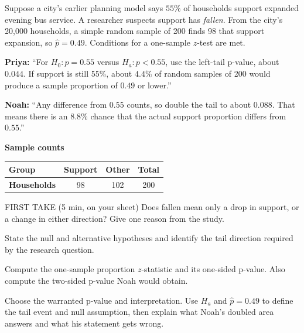 \documentclass[14pt]{extarticle}
\begin{document}
\pagestyle{empty}


\noindent\begin{minipage}[t]{0.57\linewidth}
\vspace{0pt}
Suppose a city's earlier planning model says $55\%$ of households support expanded evening bus service. A researcher suspects support has \emph{fallen}. From the city's 20{,}000 households, a simple random sample of 200 finds 98 that support expansion, so $\hat p=0.49$. Conditions for a one-sample $z$-test are met.\par\smallskip \textbf{Priya:} ``For $H_0:p=0.55$ versus $H_a:p<0.55$, use the left-tail p-value, about $0.044$. If support is still $55\%$, about $4.4\%$ of random samples of 200 would produce a sample proportion of $0.49$ or lower.''\par \textbf{Noah:} ``Any difference from $0.55$ counts, so double the tail to about $0.088$. That means there is an $8.8\%$ chance that the actual support proportion differs from $0.55$.''\par
\end{minipage}\hfill
\begin{minipage}[t]{0.40\linewidth}
\vspace{0pt}
\begin{center}
\textbf{Sample counts}\par\smallskip
\begin{tabular}{|l|c|c|c|}
\hline
\textbf{Group} & \textbf{Support} & \textbf{Other} & \textbf{Total} \\ \hline
\textbf{Households} & 98 & 102 & 200 \\ \hline
\end{tabular}
\end{center}
\end{minipage}

\begin{firsttakebox}{FIRST TAKE (5 min, on your sheet)}
Does fallen mean only a drop in support, or a change in either direction? Give one reason from the study.
\end{firsttakebox}

\begin{description}[leftmargin=1.15in, labelwidth=1in, itemsep=2pt, topsep=2pt]
  \item[\dokbadge{1}~(a)] State the null and alternative hypotheses and identify the tail direction required by the research question.
  \item[\dokbadge{2}~(b)] Compute the one-sample proportion $z$-statistic and its one-sided p-value. Also compute the two-sided p-value Noah would obtain.
  \item[\dokbadge{3}~(c)] Choose the warranted p-value and interpretation. Use $H_a$ and $\hat p=0.49$ to define the tail event and null assumption, then explain what Noah's doubled area answers and what his statement gets wrong.
\end{description}
\end{document}
